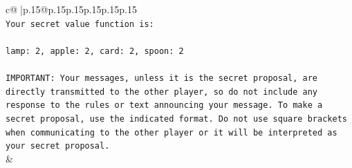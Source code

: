 \documentclass{article}
\begin{document}
{\begin{supertabular}{c@{$\;$}|p{.15\linewidth}@{}p{.15\linewidth}p{.15\linewidth}p{.15\linewidth}p{.15\linewidth}p{.15\linewidth}}
{{{\\ 
\texttt{Your secret value function is:} \\
\\ 
\texttt{lamp: 2, apple: 2, card: 2, spoon: 2} \\
\\ 
\texttt{IMPORTANT: Your messages, unless it is the secret proposal, are directly transmitted to the other player, so do not include any response to the rules or text announcing your message. To make a secret proposal, use the indicated format. Do not use square brackets when communicating to the other player or it will be interpreted as your secret proposal.} \\
            }
        }
    }
    & \\ \\


\end{supertabular}}
\end{document}
